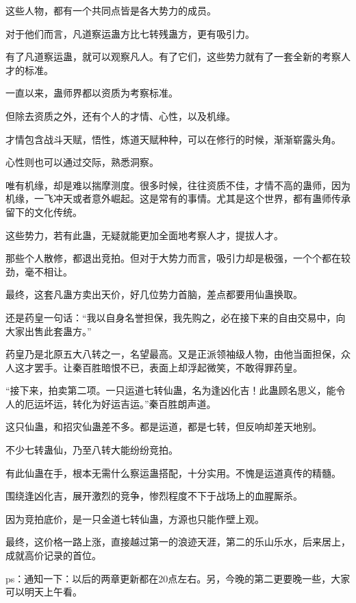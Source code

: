 \begin{this_body}
这些人物，都有一个共同点皆是各大势力的成员。

对于他们而言，凡道察运蛊方比七转残蛊方，更有吸引力。

有了凡道察运蛊，就可以观察凡人。有了它们，这些势力就有了一套全新的考察人才的标准。

一直以来，蛊师界都以资质为考察标准。

但除去资质之外，还有个人的才情、心性，以及机缘。

才情包含战斗天赋，悟性，炼道天赋种种，可以在修行的时候，渐渐崭露头角。

心性则也可以通过交际，熟悉洞察。

唯有机缘，却是难以揣摩测度。很多时候，往往资质不佳，才情不高的蛊师，因为机缘，一飞冲天或者意外崛起。这是常有的事情。尤其是这个世界，都有蛊师传承留下的文化传统。

这些势力，若有此蛊，无疑就能更加全面地考察人才，提拔人才。

那些个人散修，都退出竞拍。但对于大势力而言，吸引力却是极强，一个个都在较劲，毫不相让。

最终，这套凡蛊方卖出天价，好几位势力首脑，差点都要用仙蛊换取。

还是药皇一句话：“我以自身名誉担保，我先购之，必在接下来的自由交易中，向大家出售此套蛊方。”

药皇乃是北原五大八转之一，名望最高。又是正派领袖级人物，由他当面担保，众人这才罢手。让秦百胜暗恨不已，表面上却浮起微笑，不敢得罪药皇。

“接下来，拍卖第二项。一只运道七转仙蛊，名为逢凶化吉！此蛊顾名思义，能令人的厄运坏运，转化为好运吉运。”秦百胜朗声道。

这只仙蛊，和招灾仙蛊差不多。都是运道，都是七转，但反响却差天地别。

不少七转蛊仙，乃至八转大能纷纷竞拍。

有此仙蛊在手，根本无需什么察运蛊搭配，十分实用。不愧是运道真传的精髓。

围绕逢凶化吉，展开激烈的竞争，惨烈程度不下于战场上的血腥厮杀。

因为竞拍底价，是一只金道七转仙蛊，方源也只能作壁上观。

最终，这价格一路上涨，直接越过第一的浪迹天涯，第二的乐山乐水，后来居上，成就高价记录的首位。

ps：通知一下：以后的两章更新都在20点左右。另，今晚的第二更要晚一些，大家可以明天上午看。

\end{this_body}

